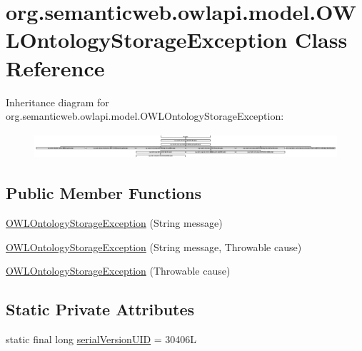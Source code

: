 \hypertarget{classorg_1_1semanticweb_1_1owlapi_1_1model_1_1_o_w_l_ontology_storage_exception}{\section{org.\-semanticweb.\-owlapi.\-model.\-O\-W\-L\-Ontology\-Storage\-Exception Class Reference}
\label{classorg_1_1semanticweb_1_1owlapi_1_1model_1_1_o_w_l_ontology_storage_exception}
}
Inheritance diagram for org.\-semanticweb.\-owlapi.\-model.\-O\-W\-L\-Ontology\-Storage\-Exception\-:\begin{figure}[H]
\begin{center}
\leavevmode
\includegraphics[height=0.947546cm]{classorg_1_1semanticweb_1_1owlapi_1_1model_1_1_o_w_l_ontology_storage_exception}
\end{center}
\end{figure}
\subsection*{Public Member Functions}
\begin{DoxyCompactItemize}
\item 
\hyperlink{classorg_1_1semanticweb_1_1owlapi_1_1model_1_1_o_w_l_ontology_storage_exception_abda1bfde5ccc8815efff2e65d8ee104c}{O\-W\-L\-Ontology\-Storage\-Exception} (String message)
\item 
\hyperlink{classorg_1_1semanticweb_1_1owlapi_1_1model_1_1_o_w_l_ontology_storage_exception_a4a4f9c3be5652f735c05e5995b837d4b}{O\-W\-L\-Ontology\-Storage\-Exception} (String message, Throwable cause)
\item 
\hyperlink{classorg_1_1semanticweb_1_1owlapi_1_1model_1_1_o_w_l_ontology_storage_exception_a945d2f2329460a0309bf064b6204ca2a}{O\-W\-L\-Ontology\-Storage\-Exception} (Throwable cause)
\end{DoxyCompactItemize}
\subsection*{Static Private Attributes}
\begin{DoxyCompactItemize}
\item 
static final long \hyperlink{classorg_1_1semanticweb_1_1owlapi_1_1model_1_1_o_w_l_ontology_storage_exception_a8fc425bd34432165cddd710737afcc9e}{serial\-Version\-U\-I\-D} = 30406\-L
\end{DoxyCompactItemize}
